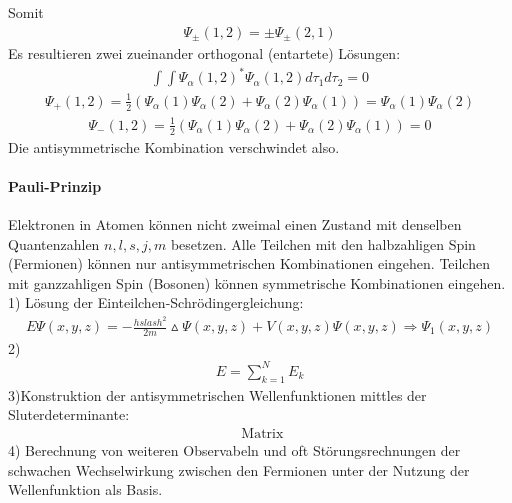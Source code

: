 \documentclass[10pt,a4paper]{article}
\begin{document}
Somit
\begin{align}
\Psi_{\pm} (1,2) = \pm \Psi_{\pm} (2,1)
\end{align}
Es resultieren zwei zueinander orthogonal (entartete) Lösungen:
\begin{align}
\int \int \Psi_{\alpha} (1,2)^* \Psi_{\alpha} (1,2) d\tau_1 d\tau_2 =0
\end{align}
\begin{align}
\Psi_+ (1,2) = \frac{1}{2} (\Psi_{\alpha} (1) \Psi_{\alpha} (2) +  \Psi_{\alpha} (2) \Psi_{\alpha} (1)) = \Psi_{\alpha} (1) \Psi_{\alpha} (2)
\end{align}
\begin{align}
\Psi_-(1,2)=  \frac{1}{2} (\Psi_{\alpha} (1) \Psi_{\alpha} (2) +  \Psi_{\alpha} (2) \Psi_{\alpha} (1)) = 0
\end{align}
Die antisymmetrische Kombination verschwindet also.
\paragraph{Pauli-Prinzip} $\,$ \\
Elektronen in Atomen können nicht zweimal einen Zustand mit denselben Quantenzahlen $ n, l, s, j, m $ besetzen. Alle Teilchen mit den halbzahligen Spin (Fermionen) können nur antisymmetrischen Kombinationen eingehen. Teilchen mit ganzzahligen Spin (Bosonen) können symmetrische Kombinationen eingehen.\\
1) Lösung der Einteilchen-Schrödingergleichung:
\begin{align}
E \Psi (x,y,z)= -\frac{hslash^2}{2m} \vartriangle \Psi (x,y,z) + V(x,y,z) \Psi (x,y,z) \Rightarrow \Psi_1 (x,y,z)
\end{align}
2)
\begin{align}
E=\sum_{k=1}^N E_k
\end{align}
3)Konstruktion der antisymmetrischen Wellenfunktionen mittles der Sluterdeterminante:
\begin{align}
\text { Matrix}
\end{align}
4) Berechnung von weiteren Observabeln und oft Störungsrechnungen der schwachen Wechselwirkung zwischen den Fermionen unter der Nutzung der Wellenfunktion als Basis.
\end{document}
